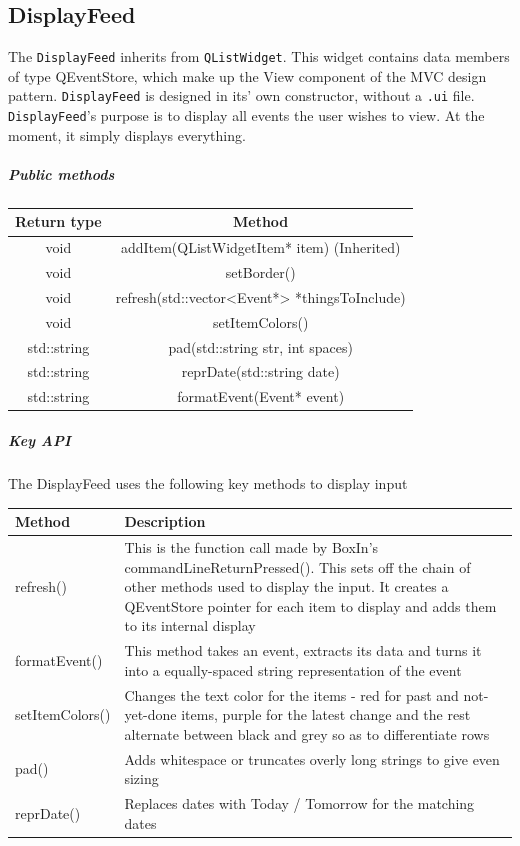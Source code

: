 \documentclass[12pt]{extarticle}
\begin{document}
\subsection{DisplayFeed}
The \texttt{DisplayFeed} inherits from \texttt{QListWidget}. This widget contains data members of type QEventStore, which make up the View component of the MVC design pattern. \texttt{DisplayFeed} is designed in its' own constructor, without a \texttt{.ui} file. \texttt{DisplayFeed}'s purpose is to display all events the user wishes to view. At the moment, it simply displays everything.
\subparagraph{Public methods}
\begin{tabular}{c c}
Return type & Method\\
\hline
void & addItem(QListWidgetItem* item) (Inherited)\\
void & setBorder()\\
void & refresh(std::vector<Event*> *thingsToInclude)\\
void & setItemColors()\\
std::string & pad(std::string str, int spaces)\\
std::string & reprDate(std::string date)\\
std::string & formatEvent(Event* event)\\
\end{tabular}

\subparagraph{Key API}The DisplayFeed uses the following key methods to display input\\
\begin{tabular}{p{6cm} p{12cm}}
Method & Description\\
\hline
refresh() & This is the function call made by BoxIn's commandLineReturnPressed(). This sets off the chain of other methods used to display the input. It creates a QEventStore pointer for each item to display and adds them to its internal display\\
formatEvent() & This method takes an event, extracts its data and turns it into a equally-spaced string representation of the event\\
setItemColors() & Changes the text color for the items - red for past and not-yet-done items, purple for the latest change and the rest alternate between black and grey so as to differentiate rows\\
pad() & Adds whitespace or truncates overly long strings to give even sizing\\
reprDate() & Replaces dates with Today / Tomorrow for the matching dates
\end{tabular}
\end{document}

